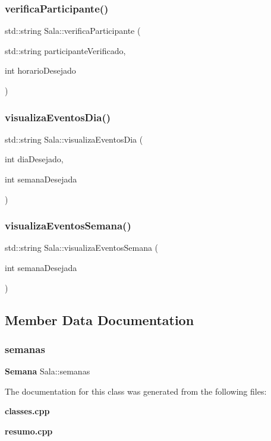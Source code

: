 \subsubsection{verifica\+Participante()}
{\footnotesize\ttfamily std\+::string Sala\+::verifica\+Participante (\begin{DoxyParamCaption}\item[{std\+::string}]{participante\+Verificado,  }\item[{int}]{horario\+Desejado }\end{DoxyParamCaption})\hspace{0.3cm}{\ttfamily [inline]}}

\mbox{\label{class_sala_a86fbf3badccd0f20983b245923712da7}} 
\subsubsection{visualiza\+Eventos\+Dia()}
{\footnotesize\ttfamily std\+::string Sala\+::visualiza\+Eventos\+Dia (\begin{DoxyParamCaption}\item[{int}]{dia\+Desejado,  }\item[{int}]{semana\+Desejada }\end{DoxyParamCaption})\hspace{0.3cm}{\ttfamily [inline]}}

\mbox{\label{class_sala_a9d925527b50c774d7072fbbc5a089582}} 
\subsubsection{visualiza\+Eventos\+Semana()}
{\footnotesize\ttfamily std\+::string Sala\+::visualiza\+Eventos\+Semana (\begin{DoxyParamCaption}\item[{int}]{semana\+Desejada }\end{DoxyParamCaption})\hspace{0.3cm}{\ttfamily [inline]}}



\subsection{Member Data Documentation}
\mbox{\label{class_sala_a9b301cdb84f342087c9ec7efb27db377}} 
\subsubsection{semanas}
{\footnotesize\ttfamily \textbf{ Semana} Sala\+::semanas}



The documentation for this class was generated from the following files\+:\begin{DoxyCompactItemize}
\item 
\textbf{ classes.\+cpp}\item 
\textbf{ resumo.\+cpp}\end{DoxyCompactItemize}
